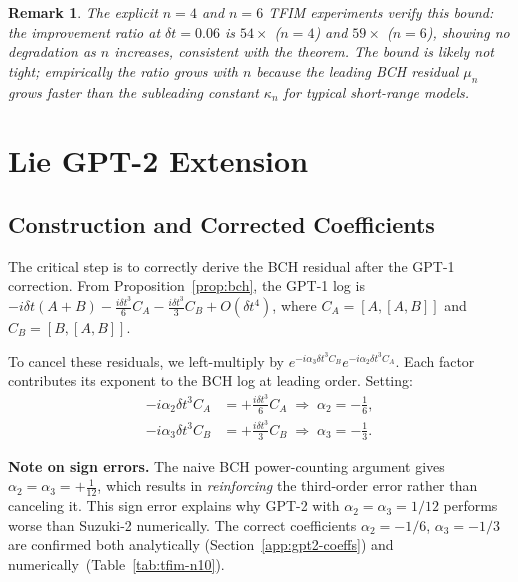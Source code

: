 \documentclass[aps,prxquantum,twocolumn,nofootinbib]{revtex4-2}
\newtheorem{remark}{Remark}
\begin{document}
\begin{remark}
  The explicit $n=4$ and $n=6$ TFIM experiments verify this bound:
  the improvement ratio at $\delta t=0.06$ is $54\times$ ($n=4$) and
  $59\times$ ($n=6$), showing no degradation as $n$ increases,
  consistent with the theorem.
  The bound is likely not tight; empirically the ratio \emph{grows}
  with $n$ because the leading BCH residual $\mu_n$ grows faster
  than the subleading constant $\kappa_n$ for typical short-range
  models.
\end{remark}

\section{Lie GPT-2 Extension}
\label{sec:gpt2ext}

\subsection{Construction and Corrected Coefficients}

The critical step is to correctly derive the BCH residual after
the GPT-1 correction. From Proposition~\ref{prop:bch}, the GPT-1
log is $-i\delta t(A+B) - \frac{i\delta t^3}{6}C_A
                         - \frac{i\delta t^3}{3}C_B + O(\delta t^4)$,
where $C_A=[A,[A,B]]$ and $C_B=[B,[A,B]]$.

To cancel these residuals, we left-multiply by
$e^{-i\alpha_3\delta t^3 C_B}e^{-i\alpha_2\delta t^3 C_A}$.
Each factor contributes its exponent to the BCH log at leading order.
Setting:
\begin{align}
  -i\alpha_2\delta t^3 C_A &= +\tfrac{i\delta t^3}{6}C_A
  \;\Rightarrow\; \alpha_2 = -\tfrac{1}{6}, \label{eq:alpha2-correct}\\
  -i\alpha_3\delta t^3 C_B &= +\tfrac{i\delta t^3}{3}C_B
  \;\Rightarrow\; \alpha_3 = -\tfrac{1}{3}. \label{eq:alpha3-correct}
\end{align}

\textbf{Note on sign errors.} The naive BCH power-counting argument
gives $\alpha_2=\alpha_3=+\tfrac{1}{12}$, which results in
\emph{reinforcing} the third-order error rather than canceling it.
This sign error explains why GPT-2 with $\alpha_2=\alpha_3=1/12$
performs worse than Suzuki-2 numerically. The correct coefficients
$\alpha_2=-1/6$, $\alpha_3=-1/3$ are confirmed both analytically
(Section~\ref{app:gpt2-coeffs}) and
numerically~(Table~\ref{tab:tfim-n10}).
\end{document}
